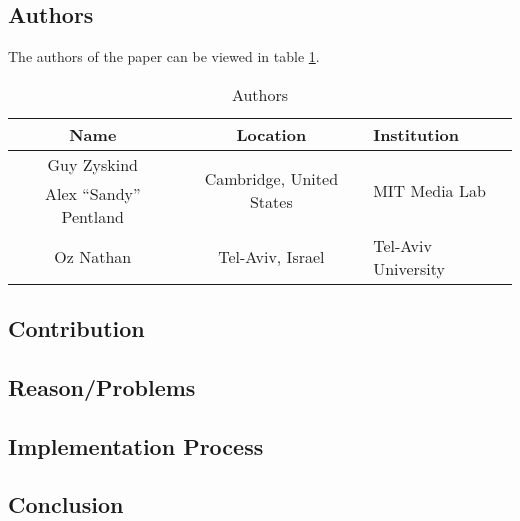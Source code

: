\clearpage
\section*{\citet{2015_Zyskind}}

\subsection*{Authors}
The authors of the paper can be viewed in table \ref{tab:2015_Zyskind_Authors}.
\begin{longtable}{ |c|c|p{5cm}| }
	\caption{Authors} \label{tab:2015_Zyskind_Authors} \\
	\hline
 	\cellcolor{Gray}Name & \cellcolor{Gray}Location & \cellcolor{Gray}Institution \\ [0.5ex] 
 	\hline\hline
 	\endhead
	 Guy Zyskind &  \multirow{2}{*}{\centering Cambridge, United States} & \multirow{2}{*}{\parbox{5cm}{\centering MIT Media Lab}} \\
	 \cline{1-1}
	 Alex \enquote{Sandy} Pentland &  & \\
	 \cline{1-3}
	 Oz Nathan & {\centering Tel-Aviv, Israel} & {\centering Tel-Aviv University} \\
	\hline
\end{longtable}


\subsection*{Contribution}



\subsection*{Reason/Problems}



\subsection*{Implementation Process}


\subsection*{Conclusion}

